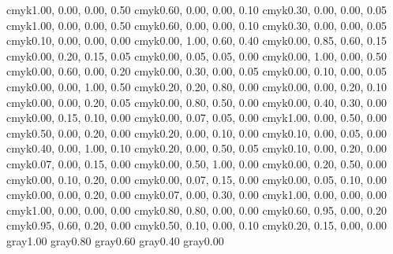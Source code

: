 \newcommand{\pointCFigure}[3]{\draw (#1) node[#3] {$#2$};
\draw (#1) node {$\times$};}
\definecolor{A1}                {cmyk}{1.00, 0.00, 0.00, 0.50}
\definecolor{A2}                {cmyk}{0.60, 0.00, 0.00, 0.10}
\definecolor{A3}                {cmyk}{0.30, 0.00, 0.00, 0.05}
\definecolor{A1}                {cmyk}{1.00, 0.00, 0.00, 0.50}
\definecolor{A2}                {cmyk}{0.60, 0.00, 0.00, 0.10}
\definecolor{A3}                {cmyk}{0.30, 0.00, 0.00, 0.05}
\definecolor{A4}                {cmyk}{0.10, 0.00, 0.00, 0.00}
\definecolor{B1}                {cmyk}{0.00, 1.00, 0.60, 0.40}
\definecolor{B2}                {cmyk}{0.00, 0.85, 0.60, 0.15}
\definecolor{B3}                {cmyk}{0.00, 0.20, 0.15, 0.05}
\definecolor{B4}                {cmyk}{0.00, 0.05, 0.05, 0.00}
\definecolor{C1}                {cmyk}{0.00, 1.00, 0.00, 0.50}
\definecolor{C2}                {cmyk}{0.00, 0.60, 0.00, 0.20}
\definecolor{C3}                {cmyk}{0.00, 0.30, 0.00, 0.05}
\definecolor{C4}                {cmyk}{0.00, 0.10, 0.00, 0.05}
\definecolor{D1}                {cmyk}{0.00, 0.00, 1.00, 0.50}
\definecolor{D2}                {cmyk}{0.20, 0.20, 0.80, 0.00}
\definecolor{D3}                {cmyk}{0.00, 0.00, 0.20, 0.10}
\definecolor{D4}                {cmyk}{0.00, 0.00, 0.20, 0.05}
\definecolor{F1}                {cmyk}{0.00, 0.80, 0.50, 0.00}
\definecolor{F2}                {cmyk}{0.00, 0.40, 0.30, 0.00}
\definecolor{F3}                {cmyk}{0.00, 0.15, 0.10, 0.00}
\definecolor{F4}                {cmyk}{0.00, 0.07, 0.05, 0.00}
\definecolor{G1}                {cmyk}{1.00, 0.00, 0.50, 0.00}
\definecolor{G2}                {cmyk}{0.50, 0.00, 0.20, 0.00}
\definecolor{G3}                {cmyk}{0.20, 0.00, 0.10, 0.00}
\definecolor{G4}                {cmyk}{0.10, 0.00, 0.05, 0.00}
\definecolor{H1}                {cmyk}{0.40, 0.00, 1.00, 0.10}
\definecolor{H2}                {cmyk}{0.20, 0.00, 0.50, 0.05}
\definecolor{H3}                {cmyk}{0.10, 0.00, 0.20, 0.00}
\definecolor{H4}                {cmyk}{0.07, 0.00, 0.15, 0.00}
\definecolor{J1}                {cmyk}{0.00, 0.50, 1.00, 0.00}
\definecolor{J2}                {cmyk}{0.00, 0.20, 0.50, 0.00}
\definecolor{J3}                {cmyk}{0.00, 0.10, 0.20, 0.00}
\definecolor{J4}                {cmyk}{0.00, 0.07, 0.15, 0.00}
\definecolor{FondOuv}           {cmyk}{0.00, 0.05, 0.10, 0.00}
\definecolor{FondTableaux}      {cmyk}{0.00, 0.00, 0.20, 0.00}
\definecolor{FondAlgo}          {cmyk}{0.07, 0.00, 0.30, 0.00}
\definecolor{BleuOuv}           {cmyk}{1.00, 0.00, 0.00, 0.00}
\definecolor{PartieFonction}    {cmyk}{1.00, 0.00, 0.00, 0.00}
\definecolor{PartieGeometrie}   {cmyk}{0.80, 0.80, 0.00, 0.00}
\definecolor{PartieStatistique} {cmyk}{0.60, 0.95, 0.00, 0.20}
\definecolor{PartieStatistiqueOLD} {cmyk}{0.95, 0.60, 0.20, 0.00}
\definecolor{U1}                {cmyk}{0.50, 0.10, 0.00, 0.10}
\definecolor{U2}                {cmyk}{0.20, 0.15, 0.00, 0.00}
\definecolor{Blanc}             {gray}{1.00}
\definecolor{gris1}             {gray}{0.80}
\definecolor{gris2}             {gray}{0.60}
\definecolor{gris3}             {gray}{0.40}
\definecolor{Noir}              {gray}{0.00}